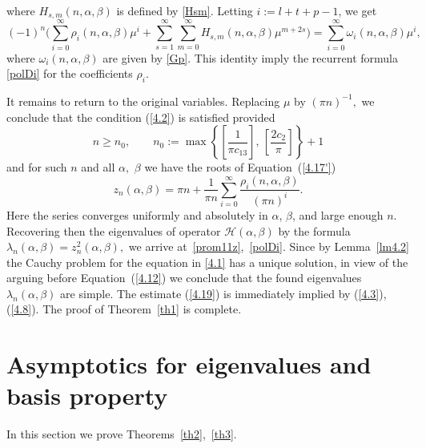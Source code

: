 \documentclass[10pt, a4paper]{article}
\theoremstyle{plain}
\theoremstyle{definition}
\numberwithin{equation}{section}
\def\l{\lambda}
\def\a{\alpha}
\def\b{\beta}
\def\Op{\mathcal{H}}
\begin{document}
where $H_{s, m}(n,\a,\b)$ is defined by \eqref{Hsm}.
Letting $i:=l+t+p-1$, we get
\begin{equation*}%
(-1)^n\bigg(\sum\limits_{i=0}^\infty\rho_i(n,\alpha, \beta)\mu^i+\sum\limits_{s=1}^\infty\sum\limits_{m=0}^\infty
H_{s, m}(n,\a,\b)\mu^{m+2s}\bigg)=\sum\limits_{i=0}^\infty\omega_i(n,\alpha, \beta)\mu^i,
\end{equation*}
where $\omega_i(n,\alpha, \beta)$ are given by \eqref{Gp}. This identity imply
 the recurrent formula \eqref{polDi} for the coefficients $\rho_i.$


It remains to return to the original variables. Replacing $\mu$ by $(\pi n)^{-1},$ we conclude that the condition (\ref{4.2}) is satisfied provided
\begin{equation}\label{4.8}
 n\geqslant n_0, \qquad n_0:=\max\left\{\left[\frac{1}{\pi c_{13}}\right],\, \left[\frac{2c_{2}}{\pi}\right]\right\}+1
\end{equation}
and for such $n$ and all $\a,$ $\b$ we have the roots of Equation~(\ref{4.17'})
\begin{equation*}%
z_n(\a,\b)=\pi n+\frac{1}{\pi n}\sum\limits_{i=0}^\infty\frac{\rho_i(n,\alpha, \beta)}{(\pi n)^i}.
\end{equation*}
Here the series  converges uniformly and absolutely in $\alpha$, $\beta$,
and large enough $n$.  Recovering then the eigenvalues of operator $\Op(\a,\b)$ by the formula $\l_n(\a,\b)=z_n^2(\a,\b),$ we arrive at~\eqref{prom11z},~\eqref{polDi}. Since by Lemma~\ref{lm4.2} the Cauchy  problem for the equation in \eqref{4.1}
has a unique solution, in view of the arguing before Equation~(\ref{4.12}) we conclude that the found eigenvalues  $\l_n(\a,\b)$ are simple. The estimate (\ref{4.19}) is immediately implied by
(\ref{4.3}), (\ref{4.8}).
The proof of Theorem~\ref{th1} is complete.

\section{Asymptotics for eigenvalues and basis property}\label{sec5}

In this section we prove  Theorems~\ref{th2},~\ref{th3}.
\end{document}
